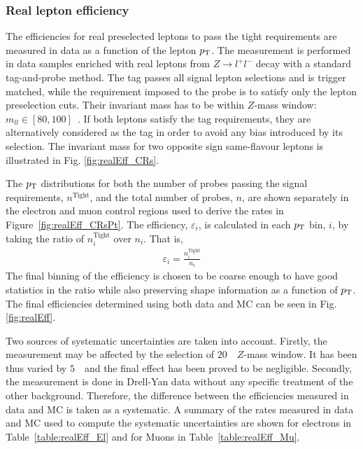 \subsubsection{Real lepton efficiency}

The efficiencies for real preselected leptons to pass the tight requirements are measured in data as a function of the lepton $p_{\mathrm{T}}$. The measurement is performed in data samples enriched with real leptons from $Z\rightarrow l^+l^-$ decay with a standard tag-and-probe method. The tag passes all signal lepton selections and is trigger matched, while the requirement imposed to the probe is to satisfy only the lepton preselection cuts. Their invariant mass has to be within $Z$-mass window: $m_{ll}\in[80, 100]$~\GeV{}. If both leptons satisfy the tag requirements, they are alternatively considered as the tag in order to avoid any bias introduced by its selection. The invariant mass for two opposite sign same-flavour leptons is illustrated in Fig. \ref{fig:realEff_CRs}.

The $p_{\mathrm{T}}$ distributions for both the number of probes passing the signal requirements, $n^{\mathrm{Tight}}$, and the total number of probes, $n$, are shown separately in the electron and muon control regions used to derive the rates in Figure~\ref{fig:realEff_CRsPt}.
The efficiency, $\varepsilon_i$, is calculated in each $p_{\mathrm{T}}$ bin, $i$, by taking the ratio of $n_{i}^{\mathrm{Tight}}$ over $n_i$. That is,
\begin{align*}
\varepsilon_i=\frac{n_{i}^{\mathrm{Tight}}}{n_{i}}
\end{align*}
The final binning of the efficiency is chosen to be coarse enough
to have good statistics in the ratio while also preserving shape information as a function
of $p_{\mathrm{T}}$. 
The final efficiencies determined using both data and MC 
can be seen in Fig. \ref{fig:realEff}.

Two sources of systematic uncertainties are taken into account. Firstly, the measurement may be affected by the selection of $20$~\GeV\ $Z$-mass window. It has been thus varied by $5$~\GeV\ and the final effect has been proved to be negligible. Secondly, the measurement is done in Drell-Yan data without any  specific treatment of the other background. Therefore, the difference between the efficiencies measured in data and MC is taken as a systematic.  A summary of the rates measured in
data and MC used to compute the systematic uncertainties are shown for electrons
in Table~\ref{table:realEff_El} and for Muons in Table~\ref{table:realEff_Mu}.

